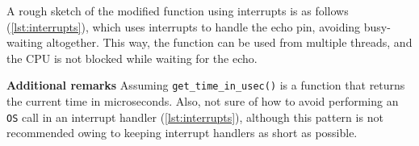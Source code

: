 A rough sketch of the modified function using interrupts is as follows (\autoref{lst:interrupts}), which uses interrupts to handle the echo pin, avoiding busy-waiting altogether.
This way, the function can be used from multiple threads, and the CPU is not blocked while waiting for the echo.

\vspace*{1em}
\textbf{Additional remarks}
Assuming \texttt{get\_time\_in\_usec()} is a function that returns the current time in microseconds.
Also, not sure of how to avoid performing an \texttt{OS} call in an interrupt handler (\autoref{lst:interrupts}), although this pattern is not recommended owing to keeping interrupt handlers as short as possible.

\clearpage


\clearpage

